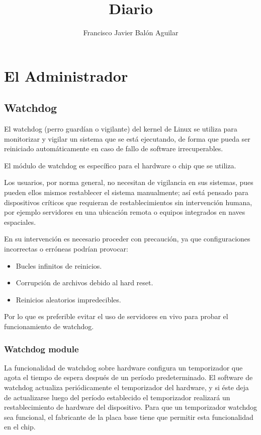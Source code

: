 \documentclass[a4paper, 11pt, titlepage]{book}
\title{Diario}
\author{Francisco Javier Balón Aguilar}
\begin{document}
\maketitle
\renewcommand{\contentsname}{Índice}
\tableofcontents
\newpage

\chapter{El Administrador}

    \section{Watchdog}

    El watchdog (perro guardían o vigilante) del kernel de Linux se utiliza para 
    monitorizar y vigilar un sistema que se está ejecutando, de forma que pueda 
    ser reiniciado automáticamente en caso de fallo de software irrecuperables.

    El módulo de watchdog es específico para el hardware o chip que se utiliza.

    Los usuarios, por norma general, no necesitan de vigilancia en sus sistemas, 
    pues pueden ellos mismos restablecer el sistema manualmente; así está pensado
    para dispositivos críticos que requieran de restablecimientos sin intervención
    humana, por ejemplo servidores en una ubicación remota o equipos integrados 
    en naves espaciales.

    En su intervención es necesario proceder con precaución, ya que configuraciones
    incorrectas o erróneas podrían provocar:

    \begin{itemize}
        \item Bucles infinitos de reinicios.
        \item Corrupción de archivos debido al hard reset.
        \item Reinicios aleatorios impredecibles.
    \end{itemize}

    Por lo que es preferible evitar el uso de servidores en vivo para probar el 
    funcionamiento de watchdog.

    \subsection{Watchdog module}

        La funcionalidad de watchdog sobre hardware configura un temporizador 
        que agota el tiempo de espera después de un período predeterminado.
        El software de watchdog actualiza periódicamente el temporizador del 
        hardware, y si éste deja de actualizarse luego del período establecido 
        el temporizador realizará un restablecimiento de hardware del dispositivo.
        Para que un temporizador watchdog sea funcional, el fabricante de la placa 
        base tiene que permitir esta funcionalidad en el chip.
\end{document}
